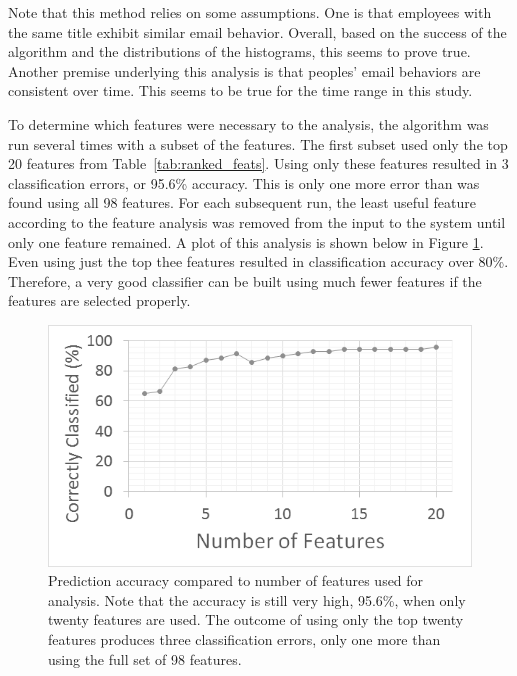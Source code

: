 \documentclass[12pt]{report}
\begin{document}
Note that this method relies on some assumptions.
One is that employees with the same title exhibit similar email behavior.
Overall, based on the success of the algorithm and the distributions of the histograms, this seems to prove true.
Another premise underlying this analysis is that peoples' email behaviors are consistent over time.
This seems to be true for the time range in this study.

To determine which features were necessary to the analysis, the algorithm was run several times with a subset of the features.
The first subset used only the top 20 features from Table~\ref{tab:ranked_feats}.
Using only these features resulted in 3 classification errors, or 95.6\% accuracy.
This is only one more error than was found using all 98 features.
For each subsequent run, the least useful feature according to the feature analysis was removed from the input to the system until only one feature remained.
A plot of this analysis is shown below in Figure \ref{fig:feat_analysis}.
Even using just the top thee features resulted in classification accuracy over 80\%.
Therefore, a very good classifier can be built using much fewer features if the features are selected properly.

\begin{figure}[t]
    \centering
        \includegraphics[width=.9\columnwidth,trim={1mm 6mm 1mm 3.5mm},clip]{FeatureAnalysis}
        \vspace{-7pt}
        \caption[Prediction accuracy compared to number of features]{Prediction accuracy compared to number of features used for analysis.  Note that the accuracy is still very high, 95.6\%, when only twenty features are used.  The outcome of using only the top twenty features produces three classification errors, only one more than using the full set of 98 features. }
        \label{fig:feat_analysis}
\end{figure}
\end{document}
